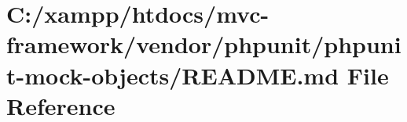 \hypertarget{vendor_2phpunit_2phpunit-mock-objects_2_r_e_a_d_m_e_8md}{}\section{C\+:/xampp/htdocs/mvc-\/framework/vendor/phpunit/phpunit-\/mock-\/objects/\+R\+E\+A\+D\+ME.md File Reference}
\label{vendor_2phpunit_2phpunit-mock-objects_2_r_e_a_d_m_e_8md}
